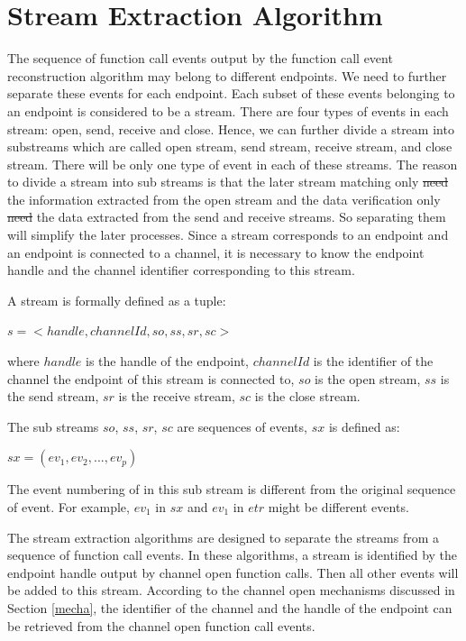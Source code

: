 \documentclass[12pt,oneside]{book}
\providecommand{\DIFaddtex}[1]{{\protect\color{blue}\uwave{#1}}} %
\providecommand{\DIFdeltex}[1]{{\protect\color{red}\sout{#1}}}                      %
\providecommand{\DIFaddbegin}{} %
\providecommand{\DIFaddend}{} %
\providecommand{\DIFdelbegin}{} %
\providecommand{\DIFdelend}{} %
\providecommand{\DIFadd}[1]{\texorpdfstring{\DIFaddtex{#1}}{#1}} %
\providecommand{\DIFdel}[1]{\texorpdfstring{\DIFdeltex{#1}}{}} %
\newcommand{\DIFscaledelfig}{0.5}
\newlength{\DIFdelgraphicswidth} %
\newlength{\DIFdelgraphicsheight} %
\newcommand{\DIFaddincludegraphics}[2][]{{\color{blue}\fbox{\DIFOincludegraphics[#1]{#2}}}} %
\newcommand{\DIFdelincludegraphics}[2][]{%
\sbox{\DIFdelgraphicsbox}{\DIFOincludegraphics[#1]{#2}}%
\settoboxwidth{\DIFdelgraphicswidth}{\DIFdelgraphicsbox} %
\settoboxtotalheight{\DIFdelgraphicsheight}{\DIFdelgraphicsbox} %
\scalebox{\DIFscaledelfig}{%
\parbox[b]{\DIFdelgraphicswidth}{\usebox{\DIFdelgraphicsbox}\\[-\baselineskip] \rule{\DIFdelgraphicswidth}{0em}}\llap{\resizebox{\DIFdelgraphicswidth}{\DIFdelgraphicsheight}{%
\setlength{\unitlength}{\DIFdelgraphicswidth}%
\begin{picture}(1,1)%
\thicklines\linethickness{2pt} %
{\color[rgb]{1,0,0}\put(0,0){\framebox(1,1){}}}%
{\color[rgb]{1,0,0}\put(0,0){\line( 1,1){1}}}%
{\color[rgb]{1,0,0}\put(0,1){\line(1,-1){1}}}%
\end{picture}%
}\hspace*{3pt}}} %
} %
\DeclareRobustCommand{\DIFaddbegin}{\DIFOaddbegin \let\includegraphics\DIFaddincludegraphics} %
\DeclareRobustCommand{\DIFaddend}{\DIFOaddend \let\includegraphics\DIFOincludegraphics} %
\DeclareRobustCommand{\DIFdelbegin}{\DIFOdelbegin \let\includegraphics\DIFdelincludegraphics} %
\DeclareRobustCommand{\DIFdelend}{\DIFOaddend \let\includegraphics\DIFOincludegraphics} %
\begin{document}
\section{Stream Extraction Algorithm}
The sequence of function call events output by the function call event reconstruction algorithm may belong to different endpoints. We need to further separate these events for each endpoint. Each subset of these events belonging to an endpoint is considered to be a stream. There are four types of events in each stream: open, send, receive and close. Hence, we can further divide a stream into substreams which are called open stream, send stream, receive stream, and close stream. There will be only one type of event in each of these streams. The reason to divide a stream into sub streams is that the later stream matching only \DIFdelbegin \DIFdel{need }\DIFdelend \DIFaddbegin \DIFadd{needs }\DIFaddend the information extracted from the open stream and the data verification only \DIFdelbegin \DIFdel{need }\DIFdelend \DIFaddbegin \DIFadd{needs }\DIFaddend the data extracted from the send and receive streams. So separating them will simplify the later processes. Since a stream corresponds to an endpoint and an endpoint is connected to a channel, it is necessary to know the endpoint handle and the channel identifier corresponding to this stream. 

A stream is formally defined as a tuple:

$s = <handle, channelId, so, ss, sr, sc>$

where $handle$ is the handle of the endpoint, $channelId$ is the identifier of the channel the endpoint of this stream is connected to, $so$ is the open stream, $ss$ is the send stream, $sr$ is the receive stream, $sc$ is the close stream. 

The sub streams $so$, $ss$, $sr$, $sc$ are sequences of events, $sx$ is defined as:

$sx = (ev_1, ev_2, ..., ev_p)$

The event numbering of in this sub stream is different from the original sequence of event. For example, $ev_1$ in $sx$ and $ev_1$ in $etr$ might be different events.

The stream extraction algorithms are designed to separate the streams from a sequence of function call events. In these algorithms, a stream is identified by the endpoint handle output by channel open function calls. Then all other events will be added to this stream.  According to the channel open mechanisms discussed in Section \ref{mecha}, the identifier of the channel and the handle of the endpoint can be retrieved from the channel open function call events.
\end{document}
